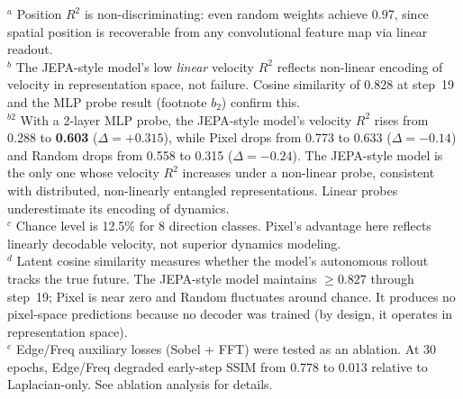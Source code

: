\begin{table}[t]
    \vspace{0.5em}
    \footnotesize
    $^a$ Position $R^2$ is non-discriminating: even random weights achieve 0.97, since spatial position is recoverable from any convolutional feature map via linear readout. \\
    $^b$ The JEPA-style model's low \emph{linear} velocity $R^2$ reflects non-linear encoding of velocity in representation space, not failure. Cosine similarity of 0.828 at step~19 and the MLP probe result (footnote $b_2$) confirm this. \\
    $^{b2}$ With a 2-layer MLP probe, the JEPA-style model's velocity $R^2$ rises from 0.288 to \textbf{0.603} ($\Delta = +0.315$), while Pixel drops from 0.773 to 0.633 ($\Delta = -0.14$) and Random drops from 0.558 to 0.315 ($\Delta = -0.24$). The JEPA-style model is the only one whose velocity $R^2$ increases under a non-linear probe, consistent with distributed, non-linearly entangled representations. Linear probes underestimate its encoding of dynamics. \\
    $^c$ Chance level is 12.5\% for 8 direction classes. Pixel's advantage here reflects linearly decodable velocity, not superior dynamics modeling. \\
    $^d$ Latent cosine similarity measures whether the model's autonomous rollout tracks the true future. The JEPA-style model maintains $\geq 0.827$ through step~19; Pixel is near zero and Random fluctuates around chance. It produces no pixel-space predictions because no decoder was trained (by design, it operates in representation space). \\
    $^e$ Edge/Freq auxiliary losses (Sobel + FFT) were tested as an ablation. At 30 epochs, Edge/Freq degraded early-step SSIM from 0.778 to 0.013 relative to Laplacian-only. See ablation analysis for details.
\end{table}

